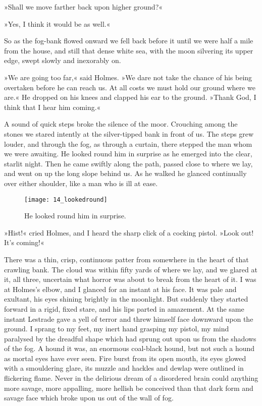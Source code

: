 »Shall we move farther back upon higher ground?«

»Yes, I think it would be as well.«

So as the fog-bank flowed onward we fell back before it until we were half a mile from the house, and still that dense white sea, with the moon silvering its upper edge, swept slowly and inexorably on.

»We are going too far,« said Holmes. »We dare not take the chance of his being overtaken before he can reach us. At all costs we must hold our ground where we are.« He dropped on his knees and clapped his ear to the ground. »Thank God, I think that I hear him coming.«

A sound of quick steps broke the silence of the moor. Crouching among the stones we stared intently at the silver-tipped bank in front of us. The steps grew louder, and through the fog, as through a curtain, there stepped the man whom we were awaiting. He looked round him in surprise as he emerged into the clear, starlit night. Then he came swiftly along the path, passed close to where we lay, and went on up the long slope behind us. As he walked he glanced continually over either shoulder, like a man who is ill at ease.

\begin{figure}[tbph]
\centering
\texttt{[image: 14\_lookedround]}
\caption{He looked round him in surprise.}
\end{figure}

»Hist!« cried Holmes, and I heard the sharp click of a cocking pistol. »Look out! It's coming!«

There was a thin, crisp, continuous patter from somewhere in the heart of that crawling bank. The cloud was within fifty yards of where we lay, and we glared at it, all three, uncertain what horror was about to break from the heart of it. I was at Holmes's elbow, and I glanced for an instant at his face. It was pale and exultant, his eyes shining brightly in the moonlight. But suddenly they started forward in a rigid, fixed stare, and his lips parted in amazement. At the same instant Lestrade gave a yell of terror and threw himself face downward upon the ground. I sprang to my feet, my inert hand grasping my pistol, my mind paralysed by the dreadful shape which had sprung out upon us from the shadows of the fog. A hound it was, an enormous coal-black hound, but not such a hound as mortal eyes have ever seen. Fire burst from its open mouth, its eyes glowed with a smouldering glare, its muzzle and hackles and dewlap were outlined in flickering flame. Never in the delirious dream of a disordered brain could anything more savage, more appalling, more hellish be conceived than that dark form and savage face which broke upon us out of the wall of fog.

